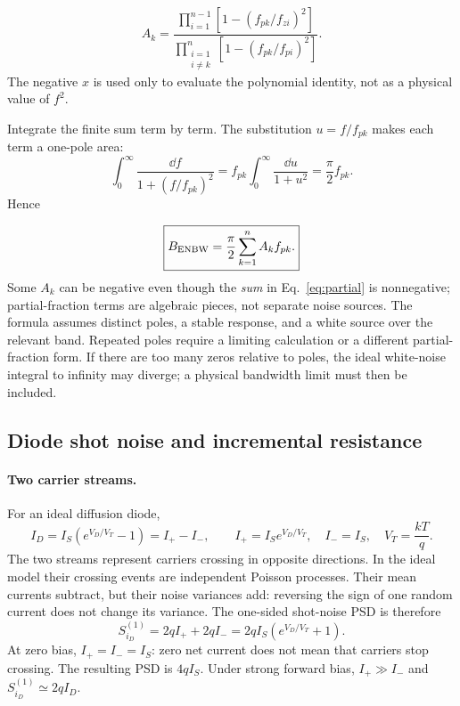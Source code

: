 \begin{equation}
A_k=\frac{\prod_{i=1}^{n-1}[1-(f_{pk}/f_{zi})^2]}
           {\prod_{\substack{i=1\\i\ne k}}^{n}[1-(f_{pk}/f_{pi})^2]}.
\label{eq:residue}
\end{equation}
The negative $x$ is used only to evaluate the polynomial identity, not as a physical value of $f^2$.

Integrate the finite sum term by term. The substitution $u=f/f_{pk}$ makes each term a one-pole area:
\[
\int_0^\infty\frac{\dd f}{1+(f/f_{pk})^2}
=f_{pk}\int_0^\infty\frac{\dd u}{1+u^2}=\frac\pi2 f_{pk}.
\]
Hence

\begin{equation}
\boxed{B_{\mathrm{ENBW}}=\frac{\pi}{2}\sum_{k=1}^{n}A_k f_{pk}.}\label{eq:general-enbw}
\end{equation}
Some $A_k$ can be negative even though the \emph{sum} in Eq.~\eqref{eq:partial} is nonnegative; partial-fraction terms are algebraic pieces, not separate noise sources. The formula assumes distinct poles, a stable response, and a white source over the relevant band. Repeated poles require a limiting calculation or a different partial-fraction form. If there are too many zeros relative to poles, the ideal white-noise integral to infinity may diverge; a physical bandwidth limit must then be included.

\subsection{Diode shot noise and incremental resistance}
\paragraph{Two carrier streams.}
For an ideal diffusion diode,
\[
I_D=I_S(e^{V_D/V_T}-1)=I_+-I_-,\qquad
I_+=I_Se^{V_D/V_T},\quad I_-=I_S,\quad V_T=\frac{kT}{q}.
\]
The two streams represent carriers crossing in opposite directions. In the ideal model their crossing events are independent Poisson processes. Their mean currents subtract, but their noise variances add: reversing the sign of one random current does not change its variance. The one-sided shot-noise PSD is therefore
\begin{equation}
\boxed{S_{i_D}^{(1)}=2qI_++2qI_-=2qI_S(e^{V_D/V_T}+1).}
\end{equation}
At zero bias, $I_+=I_-=I_S$: zero net current does not mean that carriers stop crossing. The resulting PSD is $4qI_S$. Under strong forward bias, $I_+\gg I_-$ and $S_{i_D}^{(1)}\simeq2qI_D$.

